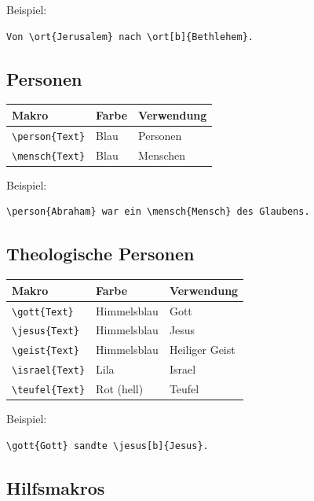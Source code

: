\documentclass[12pt,a4paper]{scrartcl}
\begin{document}
Beispiel:
\begin{lstlisting}
Von \ort{Jerusalem} nach \ort[b]{Bethlehem}.
\end{lstlisting}

\subsection{Personen}

\begin{tabular}{lll}
\toprule
\textbf{Makro} & \textbf{Farbe} & \textbf{Verwendung} \\
\midrule
\lstinline|\person{Text}| & Blau & Personen \\
\lstinline|\mensch{Text}| & Blau & Menschen \\
\bottomrule
\end{tabular}

Beispiel:
\begin{lstlisting}
\person{Abraham} war ein \mensch{Mensch} des Glaubens.
\end{lstlisting}

\subsection{Theologische Personen}

\begin{tabular}{lll}
\toprule
\textbf{Makro} & \textbf{Farbe} & \textbf{Verwendung} \\
\midrule
\lstinline|\gott{Text}| & Himmelsblau & Gott \\
\lstinline|\jesus{Text}| & Himmelsblau & Jesus \\
\lstinline|\geist{Text}| & Himmelsblau & Heiliger Geist \\
\lstinline|\israel{Text}| & Lila & Israel \\
\lstinline|\teufel{Text}| & Rot (hell) & Teufel \\
\bottomrule
\end{tabular}

Beispiel:
\begin{lstlisting}
\gott{Gott} sandte \jesus[b]{Jesus}.
\end{lstlisting}

\subsection{Hilfsmakros}
\end{document}
